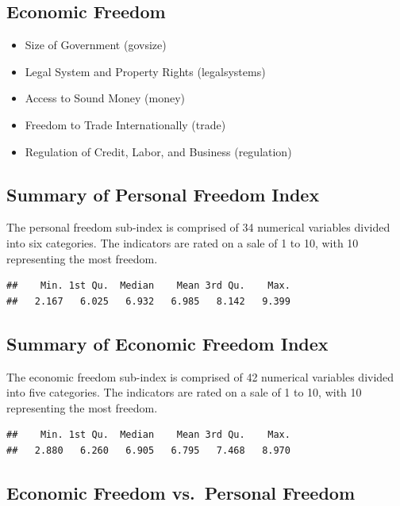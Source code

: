 \documentclass[]{article}
\providecommand{\tightlist}{%
  \setlength{\itemsep}{0pt}\setlength{\parskip}{0pt}}
\begin{document}
\hypertarget{economic-freedom}{%
\subsection{Economic Freedom}\label{economic-freedom}}

\begin{itemize}
\tightlist
\item
  Size of Government (govsize)
\item
  Legal System and Property Rights (legalsystems)
\item
  Access to Sound Money (money)
\item
  Freedom to Trade Internationally (trade)
\item
  Regulation of Credit, Labor, and Business (regulation)
\end{itemize}

\hypertarget{summary-of-personal-freedom-index}{%
\subsection{Summary of Personal Freedom
Index}\label{summary-of-personal-freedom-index}}

The personal freedom sub-index is comprised of 34 numerical variables
divided into six categories. The indicators are rated on a sale of 1 to
10, with 10 representing the most freedom.

\begin{verbatim}
##    Min. 1st Qu.  Median    Mean 3rd Qu.    Max. 
##   2.167   6.025   6.932   6.985   8.142   9.399
\end{verbatim}

\hypertarget{summary-of-economic-freedom-index}{%
\subsection{Summary of Economic Freedom
Index}\label{summary-of-economic-freedom-index}}

The economic freedom sub-index is comprised of 42 numerical variables
divided into five categories. The indicators are rated on a sale of 1 to
10, with 10 representing the most freedom.

\begin{verbatim}
##    Min. 1st Qu.  Median    Mean 3rd Qu.    Max. 
##   2.880   6.260   6.905   6.795   7.468   8.970
\end{verbatim}

\hypertarget{economic-freedom-vs.personal-freedom}{%
\subsection{Economic Freedom vs.~Personal
Freedom}\label{economic-freedom-vs.personal-freedom}}
\end{document}
